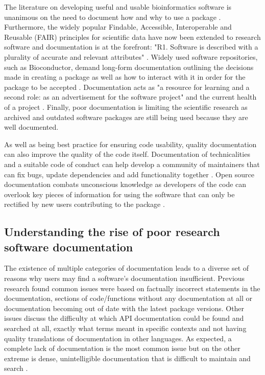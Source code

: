 \documentclass[../main.tex]{subfiles}
\begin{document}
The literature on developing useful and usable bioinformatics software is unanimous on the need to document how and why to use a package \parencite{Wilson2017,Taschuk2017,Leprevost2014}.
Furthermore, the widely popular Findable, Accessible, Interoperable and Reusable (FAIR) principles for scientific data have now been extended to research software and documentation is at the forefront: "R1. Software is described with a plurality of accurate and relevant attributes" \parencite{Barker2022}.
Widely used software repositories, such as Bioconductor, demand long-form documentation outlining the decisions made in creating a package as well as how to interact with it in order for the package to be accepted \parencite{Gentleman2004}.
Documentation acts as "a resource for learning and a second role: as an advertisement for the software project" and the current health of a project \parencite{Geiger2018}.
Finally, poor documentation is limiting the scientific research as archived and outdated software packages are still being used because they are well documented.

As well as being best practice for ensuring code usability, quality documentation can also improve the quality of the code itself.
Documentation of technicalities and a suitable code of conduct can help develop a community of maintainers that can fix bugs, update dependencies and add functionality together \parencite{Community2022}.
Open source documentation combats unconscious knowledge as developers of the code can overlook key pieces of information for using the software that can only be rectified by new users contributing to the package \parencite{Hermann2022}.


\subsection{Understanding the rise of poor research software documentation}

The existence of multiple categories of documentation leads to a diverse set of reasons why users may find a software’s documentation insufficient.
Previous research found common issues were based on factually incorrect statements in the documentation, sections of code/functions without any documentation at all or documentation becoming out of date with the latest package versions.
Other issues discuss the difficulty at which API documentation could be found and searched at all, exactly what terms meant in specific contexts and not having quality translations of documentation in other languages.
As expected, a complete lack of documentation is the most common issue but on the other extreme is dense, unintelligible documentation that is difficult to maintain and search \parencite{Aghajani2019}.
\end{document}
